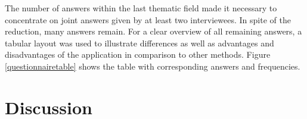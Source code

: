 \documentclass[12pt,numbers=noenddot,parskip,bibliography=totocnumbered,listof=totocnumbered,draft]{scrreprt}
\begin{document}
The number of answers within the last thematic field made it necessary to concentrate on joint answers given by at least two interviewees. In spite of the reduction, many answers remain. For a clear overview of all remaining answers, a tabular layout was used to illustrate differences as well as advantages and disadvantages of the application in comparison to other methods. Figure \ref{questionnairetable} shows the table with corresponding answers and frequencies.

\chapter{Discussion}


\end{document}

